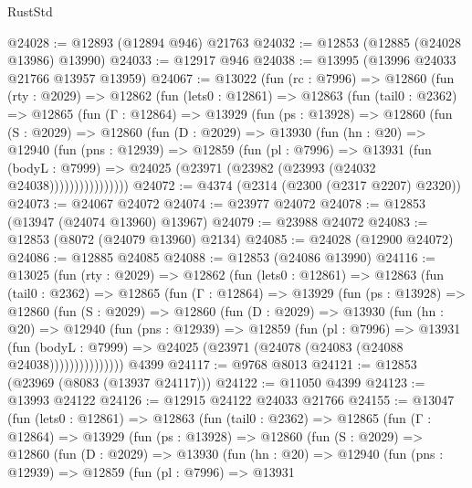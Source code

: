 \begin{lexlean}{RustStd}
\begin{coremodule}
@24028 := @12893 (@12894 @946) @21763
@24032 := @12853 (@12885 (@24028 @13986) @13990)
@24033 := @12917 @946
@24038 := @13995 (@13996 @24033 @21766 @13957 @13959)
@24067 := @13022
    (fun (rc : @7996) =>
    @12860
      (fun (rty : @2029) =>
      @12862
        (fun (lets0 : @12861) =>
        @12863
          (fun (tail0 : @2362) =>
          @12865
            (fun (Γ : @12864) =>
            @13929
              (fun (ps : @13928) =>
              @12860
                (fun (S : @2029) =>
                @12860
                  (fun (D : @2029) =>
                  @13930
                    (fun (hn : @20) =>
                    @12940
                      (fun (pns : @12939) =>
                      @12859
                        (fun (pl : @7996) =>
                        @13931
                          (fun (bodyL : @7999) =>
                          @24025 (@23971 (@23982 (@23993 (@24032 @24038))))))))))))))))
@24072 := @4374 (@2314 (@2300 (@2317 @2207) @2320))
@24073 := @24067 @24072
@24074 := @23977 @24072
@24078 := @12853 (@13947 (@24074 @13960) @13967)
@24079 := @23988 @24072
@24083 := @12853 (@8072 (@24079 @13960) @2134)
@24085 := @24028 (@12900 @24072)
@24086 := @12885 @24085
@24088 := @12853 (@24086 @13990)
@24116 := @13025
    (fun (rty : @2029) =>
    @12862
      (fun (lets0 : @12861) =>
      @12863
        (fun (tail0 : @2362) =>
        @12865
          (fun (Γ : @12864) =>
          @13929
            (fun (ps : @13928) =>
            @12860
              (fun (S : @2029) =>
              @12860
                (fun (D : @2029) =>
                @13930
                  (fun (hn : @20) =>
                  @12940
                    (fun (pns : @12939) =>
                    @12859
                      (fun (pl : @7996) =>
                      @13931
                        (fun (bodyL : @7999) =>
                        @24025 (@23971 (@24078 (@24083 (@24088 @24038)))))))))))))))
    @4399
@24117 := @9768 @8013
@24121 := @12853 (@23969 (@8083 (@13937 @24117)))
@24122 := @11050 @4399
@24123 := @13993 @24122
@24126 := @12915 @24122 @24033 @21766
@24155 := @13047
    (fun (lets0 : @12861) =>
    @12863
      (fun (tail0 : @2362) =>
      @12865
        (fun (Γ : @12864) =>
        @13929
          (fun (ps : @13928) =>
          @12860
            (fun (S : @2029) =>
            @12860
              (fun (D : @2029) =>
              @13930
                (fun (hn : @20) =>
                @12940
                  (fun (pns : @12939) =>
                  @12859
                    (fun (pl : @7996) =>
                    @13931

\end{coremodule}
\end{lexlean}
